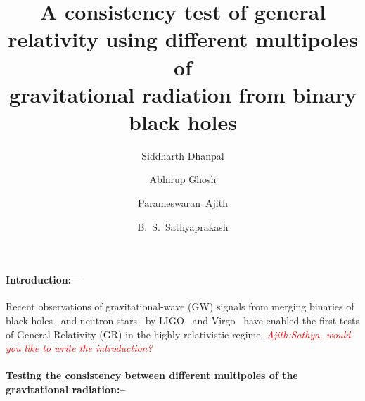 \documentclass[prl,preprintnumbers,twocolumn,eqsecnum,floatfix,a4paper,nofootinbib,superscriptaddress]{revtex4}
\newcommand{\ajith}[1]{\textcolor{red}{\textit{Ajith:#1}}}
\begin{document}
\title{A consistency test of general relativity using different multipoles of \\gravitational radiation from binary black holes}
\author{Siddharth Dhanpal}
\author{Abhirup Ghosh}
\author{Parameswaran~Ajith}
\author{B.~S.~Sathyaprakash}

\begin{abstract}
\end{abstract}
\maketitle
\paragraph{Introduction:---}

Recent observations of gravitational-wave (GW) signals from merging binaries of black holes~\cite{bbh_refs} and neutron stars~\cite{bns_ref} by LIGO~\cite{ligo_ref} and Virgo~\cite{virgo_ref} have enabled the first tests of General Relativity (GR) in the highly relativistic regime. \ajith{Sathya, would you like to write the introduction?}

\paragraph{Testing the consistency between different multipoles of the gravitational radiation:--}
\end{document}
